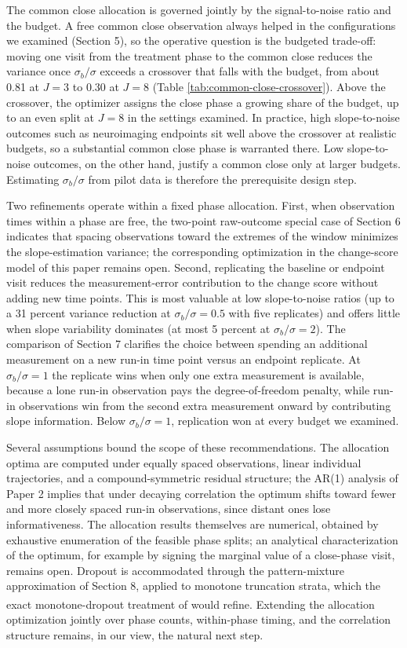 \documentclass[
  11pt,
]{article}
\begin{document}
The common close allocation is governed jointly by the
signal-to-noise ratio and the budget. A free common close
observation always helped in the configurations we
examined (Section 5), so the operative question is the
budgeted trade-off: moving one visit from the treatment
phase to the common close reduces the variance once
\(\sigma_b / \sigma\) exceeds a crossover that falls with
the budget, from about 0.81 at \(J = 3\) to 0.30 at \(J = 8\)
(Table \ref{tab:common-close-crossover}). Above the
crossover, the optimizer assigns the close phase a growing
share of the budget, up to an even split at \(J = 8\) in the
settings examined. In practice, high slope-to-noise
outcomes such as neuroimaging endpoints sit well above the
crossover at realistic budgets, so a substantial common
close phase is warranted there. Low slope-to-noise
outcomes, on the other hand, justify a common close only
at larger budgets. Estimating \(\sigma_b / \sigma\) from
pilot data is therefore the prerequisite design step.

Two refinements operate within a fixed phase allocation.
First, when observation times within a phase are free, the
two-point raw-outcome special case of Section 6 indicates
that spacing observations toward the extremes of the
window minimizes the slope-estimation variance; the
corresponding optimization in the change-score model of
this paper remains open. Second, replicating the baseline
or endpoint visit reduces the measurement-error
contribution to the change score without adding new time
points. This is most valuable at low slope-to-noise ratios
(up to a 31 percent variance reduction at
\(\sigma_b / \sigma = 0.5\) with five replicates) and offers
little when slope variability dominates (at most 5 percent
at \(\sigma_b / \sigma = 2\)). The comparison of Section 7
clarifies the choice between spending an additional
measurement on a new run-in time point versus an endpoint
replicate. At \(\sigma_b / \sigma = 1\) the replicate wins
when only one extra measurement is available, because a
lone run-in observation pays the degree-of-freedom
penalty, while run-in observations win from the second
extra measurement onward by contributing slope
information. Below \(\sigma_b / \sigma = 1\), replication
won at every budget we examined.

Several assumptions bound the scope of these
recommendations. The allocation optima are computed under
equally spaced observations, linear individual
trajectories, and a compound-symmetric residual structure;
the AR(1) analysis of Paper 2 implies that under decaying
correlation the optimum shifts toward fewer and more
closely spaced run-in observations, since distant ones
lose informativeness. The allocation results themselves
are numerical, obtained by exhaustive enumeration of the
feasible phase splits; an analytical characterization of
the optimum, for example by signing the marginal value of
a close-phase visit, remains open. Dropout is accommodated
through the pattern-mixture approximation of Section 8,
applied to monotone truncation strata, which the exact
monotone-dropout treatment of\textsuperscript{} would refine.
Extending the allocation optimization jointly over phase
counts, within-phase timing, and the correlation structure
remains, in our view, the natural next step.
\end{document}
